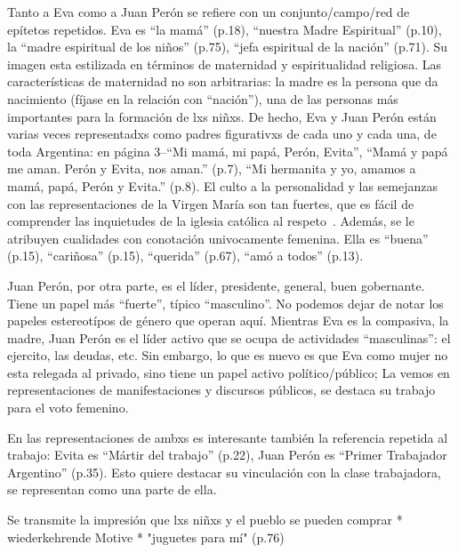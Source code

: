 Tanto a Eva como a Juan Perón se refiere con un conjunto/campo/red de epítetos repetidos.
Eva es ``la mamá'' (p.18), ``nuestra Madre Espiritual'' (p.10), la ``madre espiritual de los niños'' (p.75), ``jefa espiritual de la nación'' (p.71).
Su imagen esta estilizada en términos de maternidad y espiritualidad religiosa.
Las características de maternidad no son arbitrarias: la madre es la persona que da nacimiento (fíjase en la relación con ``nación''), una de las personas más importantes para la formación de lxs niñxs.
De hecho, Eva y Juan Perón están varias veces representadxs como padres figurativxs de cada uno y cada una, de toda Argentina:
en página 3--``Mi mamá, mi papá, Perón, Evita'', ``Mamá y papá me aman. Perón y Evita, nos aman.'' (p.7), ``Mi hermanita y yo, amamos a mamá, papá, Perón y Evita.'' (p.8).
El culto a la personalidad y las semejanzas con las representaciones de la Virgen María son tan fuertes, que es fácil de comprender las inquietudes de la iglesia católica al respeto~\autocite{Chamosa2010}.
Además, se le atribuyen cualidades con conotación univocamente femenina.
Ella es ``buena'' (p.15), ``cariñosa'' (p.15), ``querida'' (p.67), ``amó a todos'' (p.13).

Juan Perón, por otra parte, es el líder, presidente, general, buen gobernante.
Tiene un papel más ``fuerte'', típico ``masculino''.
No podemos dejar de notar los papeles estereotípos de género que operan aquí.
Mientras Eva es la compasiva, la madre, Juan Perón es el líder activo que se ocupa de actividades ``masculinas'': el ejercito, las deudas, etc.
Sin embargo, lo que es nuevo es que Eva como mujer no esta relegada al privado, sino tiene un papel activo político/público;
La vemos en representaciones de manifestaciones y discursos públicos, se destaca su trabajo para el voto femenino.

En las representaciones de ambxs es interesante también la referencia repetida al trabajo:
Evita es ``Mártir del trabajo'' (p.22),
Juan Perón es ``Primer Trabajador Argentino'' (p.35).
Esto quiere destacar su vinculación con la clase trabajadora, se representan como una parte de ella.

Se transmite la impresión que lxs niñxs y el pueblo se pueden comprar
* wiederkehrende Motive
  * "juguetes para mí" (p.76)

